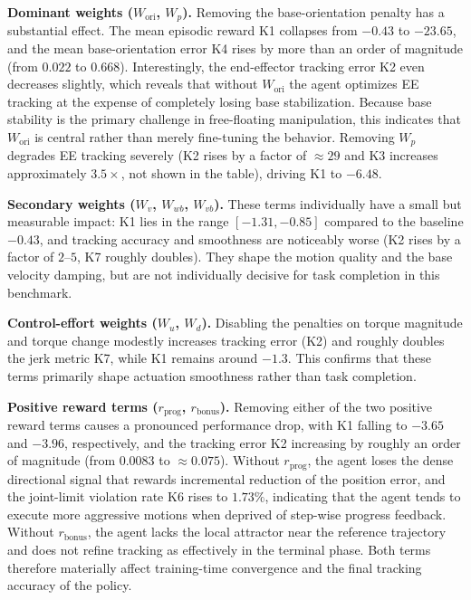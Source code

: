 \documentclass{ieeeaccess}
\begin{document}
\noindent\textbf{Dominant weights ($W_{\mathrm{ori}}$, $W_p$).} Removing the base-orientation penalty has a substantial effect. The mean
episodic reward K1 collapses from $-0.43$ to $-23.65$, and the mean base-orientation error K4
rises by more than an order of
magnitude (from $0.022$ to $0.668$). Interestingly, the end-effector tracking error K2 even decreases slightly,
which reveals that
without $W_{\mathrm{ori}}$ the agent optimizes EE tracking at the expense of completely losing base
stabilization. Because base
stability is the primary challenge in free-floating manipulation, this indicates that $W_{\mathrm{ori}}$ is central
rather than merely fine-tuning the behavior. Removing $W_p$ degrades EE tracking severely (K2 rises
by a factor of $\approx 29$
and K3 increases approximately $3.5\times$, not shown in the table), driving K1 to $-6.48$.

\noindent\textbf{Secondary weights ($W_v$, $W_{wb}$, $W_{vb}$).} These terms individually have a small but measurable impact:
K1 lies in the range $[-1.31, -0.85]$ compared to the baseline $-0.43$, and tracking
accuracy and smoothness are noticeably worse
(K2 rises by a factor of $2$–$5$, K7 roughly doubles). They shape the motion
quality and the base velocity damping, but are not
individually decisive for task completion in this benchmark.

\noindent\textbf{Control-effort weights ($W_u$, $W_d$).} Disabling the penalties on torque magnitude and torque change modestly
increases tracking error (K2) and roughly doubles the jerk metric K7, while K1 remains
around $-1.3$. This confirms that these
terms primarily shape actuation smoothness rather than task completion.

\noindent\textbf{Positive reward terms ($r_{\text{prog}}$, $r_{\text{bonus}}$).} Removing either of the two positive reward terms
causes a pronounced performance drop, with K1 falling to $-3.65$ and $-3.96$, respectively, and
the tracking error K2 increasing
by roughly an order of magnitude (from $0.0083$ to $\approx 0.075$). Without $r_{\text{prog}}$, the
agent loses the dense
directional signal that rewards incremental reduction of the position error, and the joint-limit violation
rate K6 rises to
$1.73\%$, indicating that the agent tends to execute more aggressive motions when deprived of
step-wise progress feedback.
Without $r_{\text{bonus}}$, the agent lacks the local attractor near the reference trajectory and does
not refine tracking
as effectively in the terminal phase. Both terms therefore materially affect training-time convergence
and the final tracking accuracy of the policy.
\end{document}
